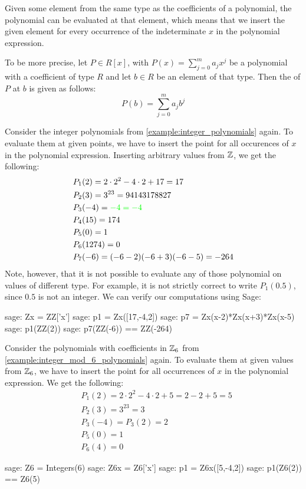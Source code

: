 Given some element from the same type as the coefficients of a polynomial, the polynomial can be evaluated at that element, which means that we insert the given element for every occurrence of the indeterminate $x$ in the polynomial expression.

To be more precise, let $P\in R[x]$, with $P(x)=\sum_{j=0}^m a_j x^j$ be a polynomial with a coefficient of type $R$ and let $b\in R$ be an element of that type. Then the  of $P$ at $b$ is given as follows:
\begin{equation}
P(b) = \sum_{j=0}^m a_j b^j
\end{equation}
\begin{example}Consider the integer polynomials from \examplename{} \ref{example:integer_polynomials} again. To evaluate them at given points, we have to insert the point for all occurences of $x$ in the polynomial expression. Inserting arbitrary values from $\mathbb{Z}$, we get the following:
\begin{align*}
 &P_1(2)    = 2\cdot 2^2 -4\cdot 2 +17 = 17 \\
 &P_2(3)    = 3^{23}=94143178827 \\
 &P_3(-4)   =\textcolor{green}{ -4 = -4 }\\
 &P_4(15)   = 174 \\
 &P_5(0)    = 1 \\
 &P_6(1274) =0 \\
 &P_7(-6)   = (-6-2)(-6+3)(-6-5) = -264 \\
\end{align*}
Note, however, that it is not possible to evaluate any of those polynomial on values of different type. For example, it is not strictly correct to write $P_1(0.5)$, since $0.5$ is not an integer. We can verify our computations using  Sage:
\begin{sagecommandline}
sage: Zx = ZZ['x']
sage: p1 = Zx([17,-4,2])
sage: p7 = Zx(x-2)*Zx(x+3)*Zx(x-5)
sage: p1(ZZ(2))
sage: p7(ZZ(-6)) == ZZ(-264)
\end{sagecommandline}

\end{example}
\begin{example} Consider the polynomials with coefficients in $\mathbb{Z}_6$ from \examplename{} \ref{example:integer_mod_6_polynomials} again. To evaluate them at given values from $\mathbb{Z}_6$, we have to insert the point for all occurrences of $x$ in the polynomial expression. We get the following:
\begin{align*}
 & P_1(2)= 2\cdot 2^2 -4\cdot 2 +5 = 2 - 2 + 5 = 5\\
 &P_2(3)= 3^{23}=3\\
 &P_3(-4)= P_3(2) = 2\\
 &P_5(0)= 1\\
 &P_6(4)=0
\end{align*}
\begin{sagecommandline}
sage: Z6 = Integers(6)
sage: Z6x = Z6['x']
sage: p1 = Z6x([5,-4,2])
sage: p1(Z6(2)) == Z6(5)
\end{sagecommandline}

\end{example}

